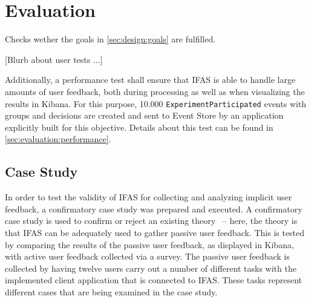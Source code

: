 %
\chapter{Evaluation}
\label{ch:evaluation}


Checks wether the goals in \cref{sec:design:goals} are fulfilled.

[Blurb about user tests ...]

Additionally, a performance test shall ensure that \acf{IFAS} is able to handle large amounts of user feedback, both during processing as well as when visualizing the results in Kibana.
For this purpose, 10.000 \texttt{ExperimentParticipated} events with groups and decisions are created and sent to Event Store by an application explicitly built for this objective.
Details about this test can be found in \cref{sec:evaluation:performance}.


\section{Case Study}
\label{sec:evaluation:user}

In order to test the validity of \ac{IFAS} for collecting and analyzing implicit user feedback, a confirmatory case study was prepared and executed.
A confirmatory case study is used to confirm or reject an existing theory~\cite{Easterbrook2008} -- here, the theory is that \ac{IFAS} can be adequately used to gather passive user feedback.
This is tested by comparing the results of the passive user feedback, as displayed in Kibana, with active user feedback collected via a survey.
The passive user feedback is collected by having twelve users carry out a number of different tasks with the implemented client application that is connected to \ac{IFAS}.
These tasks represent different cases that are being examined in the case study.


